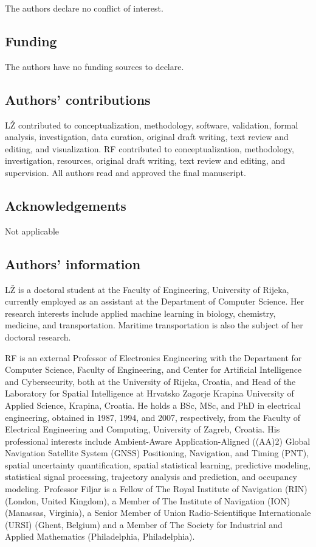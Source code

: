 \let\LaTeXcline\cline\documentclass[sn-mathphys-num]{sn-jnl}\let\cline\LaTeXcline
\begin{document}
The authors declare no conflict of interest.

\subsection{Funding}

The authors have no funding sources to declare.

\subsection{Authors' contributions}

L\v{Z} contributed to conceptualization, methodology, software, validation, formal analysis, investigation, data curation, original draft writing, text review and editing, and visualization. RF contributed to conceptualization, methodology, investigation, resources, original draft writing, text review and editing, and supervision. All authors read and approved the final manuscript.

\subsection{Acknowledgements}

Not applicable

\subsection{Authors' information}

L\v{Z} is a doctoral student at the Faculty of Engineering, University of Rijeka, currently employed as an assistant at the Department of Computer Science. Her research interests include applied machine learning in biology, chemistry, medicine, and transportation. Maritime transportation is also the subject of her doctoral research.

RF is an external Professor of Electronics Engineering with the Department for Computer Science, Faculty of Engineering, and Center for Artificial Intelligence and Cybersecurity, both at the University of Rijeka, Croatia, and Head of the Laboratory for Spatial Intelligence at Hrvatsko Zagorje Krapina University of Applied Science, Krapina, Croatia. He holds a BSc, MSc, and PhD in electrical engineering, obtained in 1987, 1994, and 2007, respectively, from the Faculty of Electrical Engineering and Computing, University of Zagreb, Croatia. His professional interests include Ambient-Aware Application-Aligned ((AA)2) Global Navigation Satellite System (GNSS) Positioning, Navigation, and Timing (PNT), spatial uncertainty quantification, spatial statistical learning, predictive modeling, statistical signal processing, trajectory analysis and prediction, and occupancy modeling. Professor Filjar is a Fellow of The Royal Institute of Navigation (RIN) (London, United Kingdom), a Member of The Institute of Navigation (ION) (Manassas, Virginia), a Senior Member of Union Radio-Scientifique Internationale (URSI) (Ghent, Belgium) and a Member of The Society for Industrial and Applied Mathematics  (Philadelphia, Philadelphia).
\end{document}
